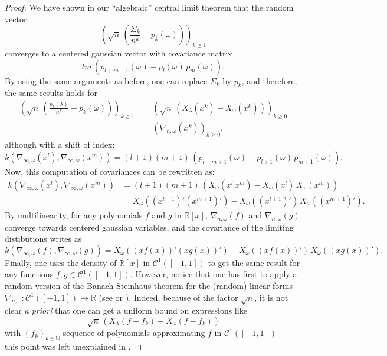 \documentclass[smallextended,nospthms]{svjour3}
\theoremstyle{remark}
\newcommand{\N}{\mathbb{N}}
\newcommand{\R}{\mathbb{R}}
\begin{document}
\begin{proof}
We have shown in our ``algebraic'' central limit theorem that the random vector 
$$\left(\sqrt{n}\,\left(\frac{\varSigma_{k}}{n^{k}} - p_{k}(\omega)\right)\right)_{k\geq 1}$$
converges to a centered gaussian vector with covariance matrix 
$$lm\,(p_{l+m-1}(\omega)-p_{l}(\omega)\,p_{m}(\omega)).$$ By using the same arguments as before, one can replace $\varSigma_{k}$ by $p_{k}$, and therefore, the same results holds for
\begin{align*}
\left(\sqrt{n}\,\left(\frac{p_{k}(\lambda)}{n^{k}}-p_{k}(\omega) \right)\right)_{k \geq 1}&=\left(\sqrt{n}\,\left(X_{\lambda}(x^{k})-X_{\omega}(x^{k}) \right)\right)_{k\geq 0}\\
&=(\nabla_{n,\omega}(x^{k}))_{k\geq 0},
\end{align*}
although with a shift of index: $$k(\nabla_{\infty,\omega}(x^{l}),\nabla_{\infty,\omega}(x^{m}))=(l+1)(m+1)\,(p_{l+m+1}(\omega)-p_{l+1}(\omega)\,p_{m+1}(\omega)).$$ 
Now, this computation of covariances can be rewritten as:
\begin{align*}k(\nabla_{\infty,\omega}(x^{l}),\nabla_{\infty,\omega}(x^{m}))&=(l+1)(m+1)\,(X_{\omega}(x^{l}\,x^{m})-X_{\omega}(x^{l})\,X_{\omega}(x^{m}))\\
&=X_{\omega}((x^{l+1})'(x^{m+1})')-X_{\omega}((x^{l+1})')\,X_{\omega}((x^{m+1})').
\end{align*}
By multilinearity, for any polynomials $f$ and $g$ in $\R[x]$, $\nabla_{n,\omega}(f)$ and $\nabla_{n,\omega}(g)$ converge towards centered gaussian variables, and the covariance of the limiting distibutions writes as
$$k(\nabla_{\infty,\omega}(f),\nabla_{\infty,\omega}(g))=X_{\omega}((xf(x))'(xg(x))')-X_{\omega}((xf(x))')\,X_{\omega}((xg(x))').$$ 
Finally, one uses the density of $\R[x]$ in $\mathscr{C}^{1}([-1,1])$ to get the same result for  any functions $f,g \in \mathscr{C}^{1}([-1,1])$.  However, notice that one has first to apply a random version of the Banach-Steinhaus theorem for the (random) linear forms $\nabla_{n,\omega} : \mathscr{C}^{1}([-1,1])\to \R$ (see \cite{Tha87} or \cite{VV95}). Indeed, because of the factor $\sqrt{n}$, it is not clear \emph{a priori} that one can get a uniform bound on expressions like
$$\sqrt{n}\,\left(X_{\lambda}(f-f_{k})-X_{\omega}(f-f_{k})\right)$$
with $(f_{k})_{k \in \N}$ sequence of polynomials approximating $f$ in $\mathscr{C}^{1}([-1,1])$ --- this point was left unexplained in \cite{FM10}.
\end{proof}
\bigskip
\bigskip
\end{document}
